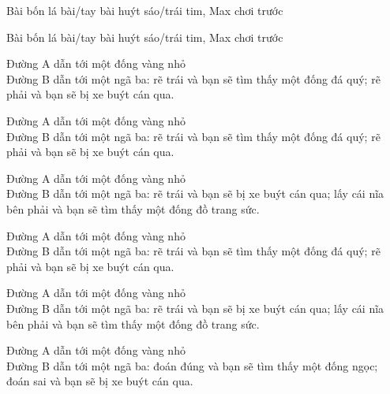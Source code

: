 \documentclass{article}
\begin{document}
\begin{huge}
Bài bốn lá bài/tay bài huýt sáo/trái tim, {\sc Max} chơi trước

\vspace*{0.1in}

\textwidth
{}


Bài bốn lá bài/tay bài huýt sáo/trái tim, {\sc Max} chơi trước

\vspace*{0.1in}

\textwidth
{}


Đường A dẫn tới một đống vàng nhỏ\\
Đường B dẫn tới một ngã ba:\nl
   rẽ trái và bạn sẽ tìm thấy một đống đá quý;\nl
   rẽ phải và bạn sẽ bị xe buýt cán qua.



Đường A dẫn tới một đống vàng nhỏ\\
Đường B dẫn tới một ngã ba:\nl
   rẽ trái và bạn sẽ tìm thấy một đống đá quý;\nl
   rẽ phải và bạn sẽ bị xe buýt cán qua.

Đường A dẫn tới một đống vàng nhỏ\\
Đường B dẫn tới một ngã ba:\nl
   rẽ trái và bạn sẽ bị xe buýt cán qua;\nl
   lấy cái nĩa bên phải và bạn sẽ tìm thấy một đống đồ trang sức.


Đường A dẫn tới một đống vàng nhỏ\\
Đường B dẫn tới một ngã ba:\nl
   rẽ trái và bạn sẽ tìm thấy một đống đá quý;\nl
   rẽ phải và bạn sẽ bị xe buýt cán qua.

Đường A dẫn tới một đống vàng nhỏ\\
Đường B dẫn tới một ngã ba:\nl
   rẽ trái và bạn sẽ bị xe buýt cán qua;\nl
   lấy cái nĩa bên phải và bạn sẽ tìm thấy một đống đồ trang sức.

Đường A dẫn tới một đống vàng nhỏ\\
Đường B dẫn tới một ngã ba:\nl
   đoán đúng và bạn sẽ tìm thấy một đống ngọc;\nl
   đoán sai và bạn sẽ bị xe buýt cán qua.



\end{huge}
\end{document}
